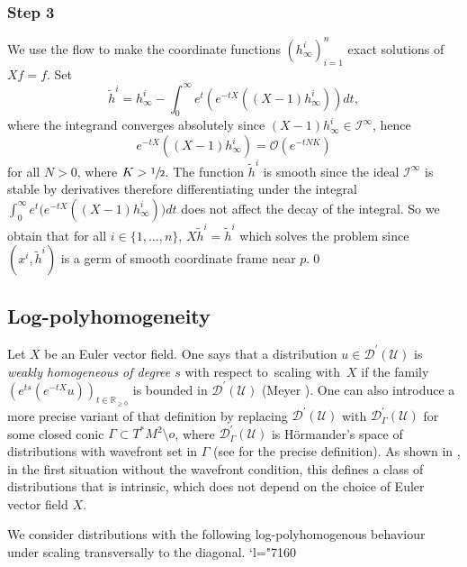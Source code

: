 \documentclass[10pt]{amsart}
\let\pazocal\mathscr
\newcommand{\Changel}{\mathcode`l="7160}
\theoremstyle{definition}
\let\euler X
\newcommand\zero{{\textit{o}}}
\newcommand{\step}[1]{\subsubsection*{Step #1}}
\begin{document}
\step{3} We use the flow to make the coordinate functions $(h_\infty^i)_{i=1}^n$ exact solutions of
$\euler f=f$.
Set
\[
\tilde{h}^i=h^i_\infty-\int_0^\infty e^{t} \left(e^{-t\euler}\left((\euler-1)h^i_\infty \right)\right) dt,
\]
where the integrand converges absolutely since $(\euler-1)h^i_\infty\in \pazocal{I}^\infty $, hence
\[
e^{-t\euler}\left((\euler-1)h^i_\infty \right)=\pazocal{O}(e^{-tNK})
\]
for all $N>0$, where $K>\sfrac{1}{2}$. The function $\tilde{h}^i$ is smooth since
the ideal $\pazocal{I}^\infty$ is stable by derivatives therefore
differentiating under the integral $\int_0^\infty e^{t} \bigl(e^{-t\euler}((\euler-1)h^i_\infty)\bigr) dt$
does not affect the decay of the integral.
So we obtain that for all $i\in \{1,\dots,n\}$, $\euler \tilde{h}^i=\tilde{h}^i$ which
solves the problem since $(x^i,\tilde{h}^i)$ is a germ of smooth coordinate frame near $p$.\qed

\subsection{Log-polyhomogeneity}

Let $\euler$ be an Euler vector field.
One says that a distribution $u\in \pazocal{D}^\prime(\pazocal{U})$
is \emph{weakly
homogeneous of degree $s$} with respect to~scaling with~$\euler$ if the family $(e^{ts} (e^{-t\euler}u))_{t\in \mathbb{R}_{\geqslant 0}}$
is bounded in $\pazocal{D}^\prime(\pazocal{U})$ (\cf Meyer \cite{Meyer}). One can also introduce a more precise variant of that definition by replacing $\pazocal{D}^\prime(\pazocal{U})$ with $\pazocal{D}^\prime_\Gamma(\pazocal{U})$ for some closed conic $\Gamma\subset T^*M^2\setminus\zero$, where $\pazocal{D}^\prime_\Gamma(\pazocal{U})$ is Hörmander's space of distributions with wavefront set in $\Gamma$ (see \cite[\S8.2]{H} for the precise definition). As shown in \cite[Th.\,1.4]{DangAHP}, {in the first situation without the wavefront condition, this defines} a class of distributions that is intrinsic, \ie which does not depend on the choice of Euler vector field $\euler$.

We consider distributions with the following log-polyhomogenous behaviour under scaling transversally to the diagonal.
\Changel
\end{document}
